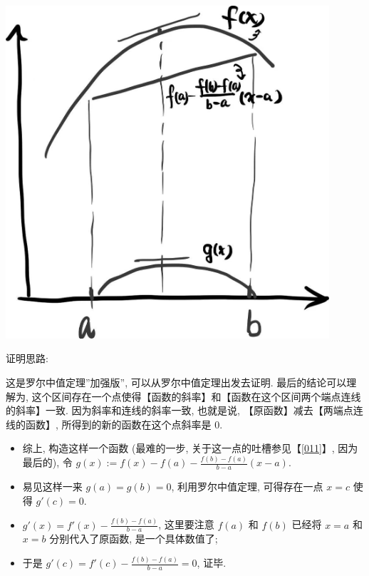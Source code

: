 \begin{tcolorbox}[size=fbox, breakable, enhanced jigsaw, title={拉格朗日中值定理 (Lagrange mean value theorem)}]



\begin{tcolorbox}[size=fbox, breakable, enhanced jigsaw, sidebyside]
\includegraphics[width=0.9\textwidth]{img/image-20230615082602908.png}
\tcblower
{}
\end{tcolorbox}

\begin{newquote}
证明思路:

这是罗尔中值定理''加强版'', 可以从罗尔中值定理出发去证明.
最后的结论可以理解为,
这个区间存在一个点使得【函数的斜率】和【函数在这个区间两个端点连线的斜率】一致.
因为斜率和连线的斜率一致, 也就是说, 【原函数】减去【两端点连线的函数】,
所得到的新的函数在这个点斜率是 $0$.

\begin{itemize}

\item
  综上, 构造这样一个函数 (最难的一步, 关于这一点的吐槽参见【\ref{011}】,
  因为最后的), 令 $g(x):=f(x)-f(a)-\frac{f(b)-f(a)}{b-a}(x-a)$.
\item
  易见这样一来 $g(a)=g(b)=0$, 利用罗尔中值定理, 可得存在一点 $x=c$
  使得 $g'(c)=0$.
\item
  $g'(x)=f'(x)-\frac{f(b)-f(a)}{b-a}$, 这里要注意 $f(a)$ 和 $f(b)$
  已经将 $x=a$ 和 $x=b$ 分别代入了原函数, 是一个具体数值了;
\item
  于是 $g'(c)=f'(c)-\frac{f(b)-f(a)}{b-a}=0$, 证毕.
\end{itemize}
\end{newquote}

\end{tcolorbox}

